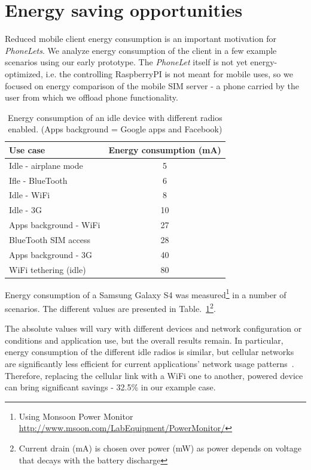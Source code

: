 \documentclass{sig-alternate-2013}
\begin{document}
\section{Energy saving opportunities}
\label{sec:energy}

Reduced mobile client energy consumption is an important motivation for \emph{PhoneLets}. We analyze energy consumption of the client in a few example scenarios using our early prototype. The \emph{PhoneLet} itself is not yet energy-optimized, i.e. the controlling RaspberryPI is not meant for mobile uses, so we focused on energy comparison of the mobile SIM server - a phone carried by the user from which we offload phone functionality.

\begin{table}[t]
{
\small
\begin{tabular}{| l | c |}
\hline
  \textbf{Use case}         & \textbf{Energy consumption (mA)}  \\ \hline
  Idle - airplane mode      & 5     \\ \hline
  Ifle - BlueTooth          & 6     \\ \hline
  Idle - WiFi               & 8     \\ \hline
  Idle - 3G                 & 10    \\ \hline
  Apps background - WiFi    & 27    \\ \hline
  BlueTooth SIM access      & 28    \\ \hline
  Apps background - 3G      & 40    \\ \hline
  WiFi tethering (idle)     & 80    \\ \hline
\end{tabular}
}
\caption{Energy consumption of an idle device with different radios enabled. (Apps background = Google apps and Facebook)}
\label{tab:energy}
\end{table}

Energy consumption of a Samsung Galaxy S4 was measured\footnote{Using Monsoon Power Monitor \url{http://www.msoon.com/LabEquipment/PowerMonitor/}} in a number of scenarios. The different values are presented in Table.~\ref{tab:energy}\footnote{Current drain (mA) is chosen over power (mW) as power depends on voltage that decays with the battery discharge}. 

The absolute values will vary with different devices and network configuration or conditions and application use, but the overall results remain. In particular, energy consumption of the different idle radios is similar, but cellular networks are significantly less efficient for current applications' network usage patterns~\cite{Aucinas:2013uk}. Therefore, replacing the cellular link with a WiFi one to another, powered device can bring significant savings - 32.5\% in our example case.
\end{document}
